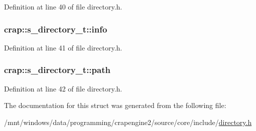 Definition at line 40 of file directory.\+h.

\hypertarget{structcrap_1_1s__directory__t_a2ab0c80ea970953293688d2851c57e89}{}
\subsubsection[{info}]{ crap\+::s\+\_\+directory\+\_\+t\+::info}\label{structcrap_1_1s__directory__t_a2ab0c80ea970953293688d2851c57e89}


Definition at line 41 of file directory.\+h.

\hypertarget{structcrap_1_1s__directory__t_a4bf89a8c3195f77152bbd81f690f9b38}{}
\subsubsection[{path}]{ crap\+::s\+\_\+directory\+\_\+t\+::path}\label{structcrap_1_1s__directory__t_a4bf89a8c3195f77152bbd81f690f9b38}


Definition at line 42 of file directory.\+h.



The documentation for this struct was generated from the following file\+:\begin{DoxyCompactItemize}
\item 
/mnt/windows/data/programming/crapengine2/source/core/include/\hyperlink{directory_8h}{directory.\+h}\end{DoxyCompactItemize}
